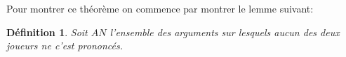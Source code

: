 \documentclass[12pt]{article}
\theoremstyle{defi}
\newtheorem{definition}{Définition}[section]
\theoremstyle{not}
\theoremstyle{prob}
\begin{document}


      Pour montrer ce théorème on commence par montrer le lemme suivant:
      \begin{definition}
        Soit $AN$ l'ensemble des arguments sur lesquels aucun des deux joueurs ne c'est prononcés.
      \end{definition}
\end{document}
